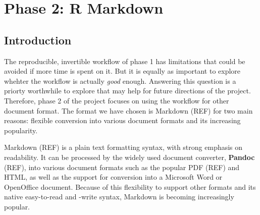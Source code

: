\documentclass[a4paper, 12pt]{report}
\begin{document}
% 
% 
% 
% 
% 
% 
% 
% 


\chapter{Phase 2: R Markdown}
\section{Introduction}
The reproducible, invertible workflow of phase 1 has limitations that could be avoided if more time is spent on it. But it is equally as important to explore whehter the workflow is actually \emph{good} enough. Answering this question is a priorty worthwhile to explore that may help for future directions of the project. Therefore, phase 2 of the project focuses on using the workflow for other document format. The format we have chosen is Markdown (REF) for two main reasons: flexible conversion into various document formats and its increasing popularity.

Markdown (REF) is a plain text formatting syntax, with strong emphasis on readability. It can be processed by the widely used document converter, \textbf{Pandoc} (REF), into various document formats such as the popular PDF (REF) and HTML, as well as the support for conversion into a Microsoft Word or OpenOffice document. Because of this flexibility to support other formats and its native easy-to-read and -write syntax, Markdown is becoming increasingly popular.
\end{document}

